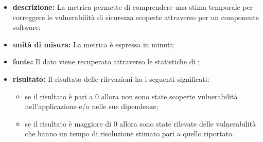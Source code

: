 			\begin{itemize}
      			\item \textbf{descrizione: }
					La metrica permette di comprendere una stima temporale per correggere le vulnerabilità di sicurezza scoperte attraverso  per un componente software;
				\item \textbf{unità di misura: }
					La metrica è espressa in minuti;
				\item \textbf{fonte: }
					Il dato viene recuperato attraverso le statistiche di ;
				\item \textbf{risultato: }
					Il risultato delle rilevazioni ha i seguenti significati:
					\begin{itemize}
						\item se il risultato è pari a 0 allora non sono state scoperte vulnerabilità nell'applicazione e/o nelle sue dipendenze;
						\item se il risultato è maggiore di 0 allora sono state rilevate delle vulnerabilità che hanno un tempo di risoluzione stimato pari a quello riportato.
					\end{itemize}
			\end{itemize}

		



